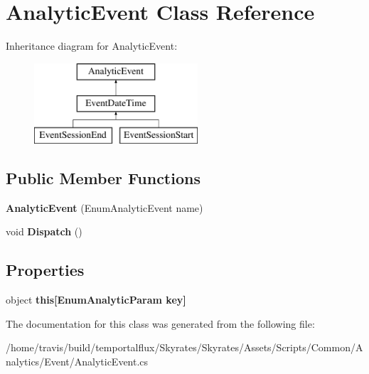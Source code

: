 \hypertarget{class_analytic_event}{\section{Analytic\-Event Class Reference}
\label{class_analytic_event}
}
Inheritance diagram for Analytic\-Event\-:\begin{figure}[H]
\begin{center}
\leavevmode
\includegraphics[height=3.000000cm]{class_analytic_event}
\end{center}
\end{figure}
\subsection*{Public Member Functions}
\begin{DoxyCompactItemize}
\item 
\hypertarget{class_analytic_event_ae88e08acca8341475eff7dd39c3febed}{{\bfseries Analytic\-Event} (Enum\-Analytic\-Event name)}\label{class_analytic_event_ae88e08acca8341475eff7dd39c3febed}

\item 
\hypertarget{class_analytic_event_a00af38488d2829fcc3b10a33653de54e}{void {\bfseries Dispatch} ()}\label{class_analytic_event_a00af38488d2829fcc3b10a33653de54e}

\end{DoxyCompactItemize}
\subsection*{Properties}
\begin{DoxyCompactItemize}
\item 
\hypertarget{class_analytic_event_aa1ec909f46899ee94f960272f5de252a}{object {\bfseries this\mbox{[}\-Enum\-Analytic\-Param key\mbox{]}}}\label{class_analytic_event_aa1ec909f46899ee94f960272f5de252a}

\end{DoxyCompactItemize}


The documentation for this class was generated from the following file\-:\begin{DoxyCompactItemize}
\item 
/home/travis/build/temportalflux/\-Skyrates/\-Skyrates/\-Assets/\-Scripts/\-Common/\-Analytics/\-Event/Analytic\-Event.\-cs\end{DoxyCompactItemize}
